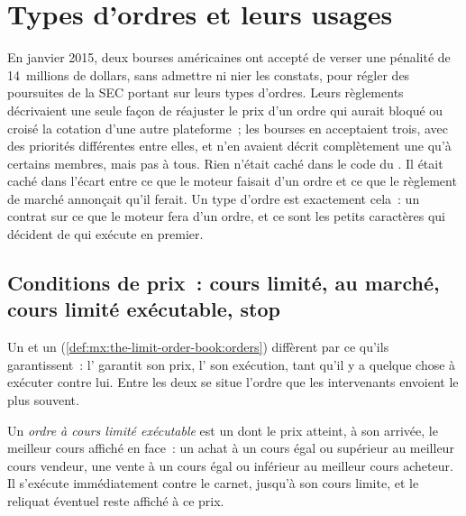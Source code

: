 \chapter{Types d'ordres et leurs usages}\label{ch:mx:order-types-and-their-uses}

En janvier 2015, deux bourses américaines ont accepté de verser une pénalité de 14~millions de dollars, sans admettre ni nier les constats, pour régler des poursuites de la SEC
portant sur leurs types d'ordres. Leurs règlements décrivaient une seule façon de réajuster le prix d'un ordre qui aurait bloqué ou croisé la cotation d'une autre plateforme~;
les bourses en acceptaient trois, avec des priorités différentes entre elles, et n'en avaient décrit complètement une qu'à certains membres, mais pas à tous. Rien n'était
caché dans le code du . Il était caché dans l'écart entre ce que le moteur faisait d'un ordre et ce que le règlement de marché annonçait
qu'il ferait. Un type d'ordre est exactement cela~: un contrat sur ce que le moteur fera d'un ordre, et ce sont les petits caractères qui décident de qui exécute en premier.

\section{Conditions de prix~: cours limité, au marché, cours limité exécutable, stop}

Un  et un  (\cref{def:mx:the-limit-order-book:orders}) diffèrent par ce qu'ils garantissent~: l' garantit son prix, l'
son exécution, tant qu'il y a quelque chose à exécuter contre lui. Entre les deux se situe l'ordre que les intervenants envoient le plus souvent.

\begin{definition}\label{def:mx:order-types-and-their-uses:marketable}
Un \emph{ordre à cours limité exécutable} est un  dont le prix atteint, à son arrivée, le meilleur cours affiché en face~: un achat à un cours égal ou
supérieur au meilleur cours vendeur, une vente à un cours égal ou inférieur au meilleur cours acheteur. Il s'exécute immédiatement contre le carnet, jusqu'à son cours limite, et le reliquat éventuel reste affiché à ce prix.
\end{definition}

